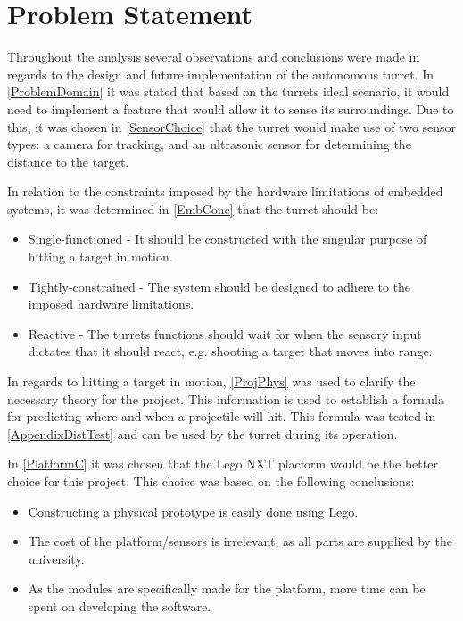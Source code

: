 \chapter{Problem Statement}

Throughout the analysis several observations and conclusions were made in
regards to the design and future implementation of the autonomous turret. In
\autoref{ProblemDomain} it was stated that based on the turrets ideal scenario,
it would need to implement a feature that would allow it to sense its
surroundings. Due to this, it was chosen in \autoref{SensorChoice} that the
turret would make use of two sensor types: a camera for tracking, and an
ultrasonic sensor for determining the distance to the target.\nl


In relation to the constraints imposed by the hardware limitations of
embedded systems, it was determined in \autoref{EmbConc} that the turret should
be:
\begin{itemize}
  \item Single-functioned - It should be constructed with the singular purpose
  of hitting a target in motion.
  \item Tightly-constrained - The system should be designed to adhere to the
  imposed hardware limitations.
  \item Reactive - The turrets functions should wait for when the sensory input
  dictates that it should react, e.g. shooting a target that moves into range. 
\end{itemize}\nl

In regards to hitting a target in motion, \autoref{ProjPhys} was used to
clarify the necessary theory for the project. This information is used to
establish a formula for predicting where and when a projectile will hit. This
formula was tested in \autoref{AppendixDistTest} and can be used by the turret
during its operation.\nl

In \autoref{PlatformC} it was chosen that the Lego NXT placform would be the
better choice for this project. This choice was based on the following
conclusions:
\begin{itemize}
  \item Constructing a physical prototype is easily done using Lego.
  \item The cost of the platform/sensors is irrelevant, as all parts are
  supplied by the university.
  \item As the modules are specifically made for the platform, more time can be
  spent on developing the software.
\end{itemize}\nl


